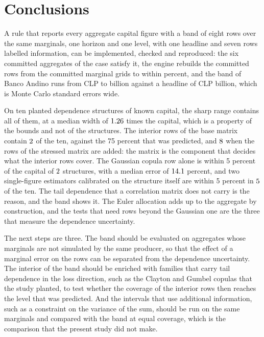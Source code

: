 \section{Conclusions}
\label{sec:conclusions}

A rule that reports every aggregate capital figure with a band of eight rows over the same marginals, one horizon and one level,
with one headline and seven rows labelled information, can be implemented, checked and reproduced: the six committed aggregates of
the case satisfy it, the engine rebuilds the committed rows from the committed marginal grids to within \bdMaxRelDiff{} percent,
and the band of Banco Andino runs from CLP \bdLower{} to \bdWorst{} billion against a headline of CLP \bdHeadline{} billion, which
is \bdWidthOverSe{} Monte Carlo standard errors wide.

On ten planted dependence structures of known capital, the sharp range contains all of them, at a median width of
$1.26$ times the capital, which is a property of the bounds and not of the structures. The interior rows of the base
matrix contain $2$ of the ten, against the 75 percent that was predicted, and $8$ when the rows of the
stressed matrix are added: the matrix is the component that decides what the interior rows cover. The Gaussian copula row alone is
within 5 percent of the capital of $2$ structures, with a median error of $14.1$ percent, and two
single-figure estimators calibrated on the structure itself are within 5 percent in $5$ of the ten. The tail dependence
that a correlation matrix does not carry is the reason, and the band shows it. The Euler allocation adds up to
the aggregate by construction, and the tests that need rows beyond the Gaussian one are the three that measure the dependence
uncertainty.

The next steps are three. The band should be evaluated on aggregates whose marginals are not simulated by the same producer, so
that the effect of a marginal error on the rows can be separated from the dependence uncertainty. The interior of the band should
be enriched with families that carry tail dependence in the loss direction, such as the Clayton and Gumbel copulas that the study
planted, to test whether the coverage of the interior rows then reaches the level that was predicted. And the intervals that
use additional information, such as a constraint on the variance of the sum, should be run on the same marginals and compared with
the band at equal coverage, which is the comparison that the present study did not make.

